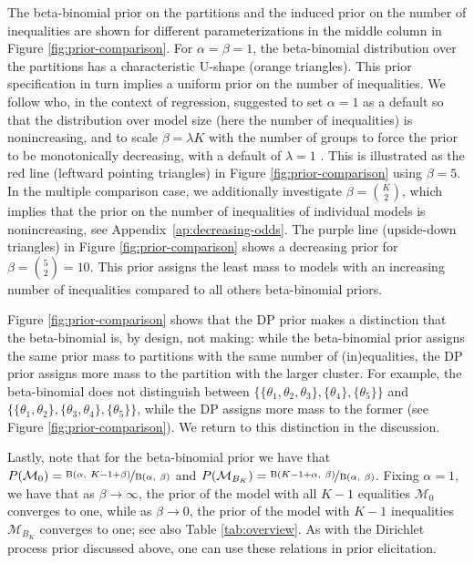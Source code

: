 \documentclass[11pt,a4paper]{article}
\theoremstyle{definition} %
\theoremstyle{case}
\newcommand{\FBeta}[2]{\text{B}\left({#1},\ {#2}\right)}
\newcommand{\DB}[1]{\todo[inline, color=orange]{ \textbf{DB}: #1 }}
\begin{document}
The beta-binomial prior on the partitions and the induced prior on the number of inequalities are shown for different parameterizations in the middle column in Figure \ref{fig:prior-comparison}. For $\alpha = \beta = 1$, the beta-binomial distribution over the partitions has a characteristic U-shape (orange triangles). This prior specification in turn implies a uniform prior on the number of inequalities. We follow \textcite{wilson2010bayesian} who, in the context of regression, suggested to set $\alpha = 1$ as a default so that the distribution over model size (here the number of inequalities) is nonincreasing, and to scale $\beta = \lambda K$ with the number of groups to force the prior to be monotonically decreasing, with a default of $\lambda = 1$ \parencite{wilson2010bayesian}. This is illustrated as the red line (leftward pointing triangles) in Figure \ref{fig:prior-comparison} using $\beta = 5$. In the multiple comparison case, we additionally investigate $\beta = {K \choose 2}$, which implies that the prior on the number of inequalities of individual models is nonincreasing, see Appendix~\ref{ap:decreasing-odds}. The purple line (upside-down triangles) in Figure \ref{fig:prior-comparison} shows a decreasing prior for $\beta = {5 \choose 2} = 10$. This prior assigns the least mass to models with an increasing number of inequalities compared to all others beta-binomial priors.


Figure \ref{fig:prior-comparison} shows that the DP prior makes a distinction that the beta-binomial is, by design, not making: while the beta-binomial prior assigns the same prior mass to partitions with the same number of (in)equalities, the DP prior assigns more mass to the partition with the larger cluster. For example, the beta-binomial does not distinguish between $\{\{\theta_1, \theta_2, \theta_3\}, \{\theta_4\}, \{\theta_5\}\}$ and $\{\{\theta_1, \theta_2\}, \{\theta_3, \theta_4\}, \{\theta_5\}\}$, while the DP assigns more mass to the former (see Figure \ref{fig:prior-comparison}). We return to this distinction in the discussion.

Lastly, note that for the beta-binomial prior we have that $P(\mathcal{M}_0) = \nicefrac{\FBeta{\alpha}{K - 1 + \beta}}{\FBeta{\alpha}{\beta}}$ and $P(\mathcal{M}_{B_K}) = \nicefrac{\FBeta{K - 1 + \alpha}{\beta}}{\FBeta{\alpha}{\beta}}$. Fixing $\alpha = 1$, we have that as $\beta \rightarrow \infty$, the prior of the model with all $K - 1$ equalities $\mathcal{M}_0$ converges to one, while as $\beta \rightarrow 0$, the prior of the model with $K - 1$ inequalities $\mathcal{M}_{B_K}$ converges to one; see also Table \ref{tab:overview}. As with the Dirichlet process prior discussed above, one can use these relations in prior elicitation.
\end{document}
